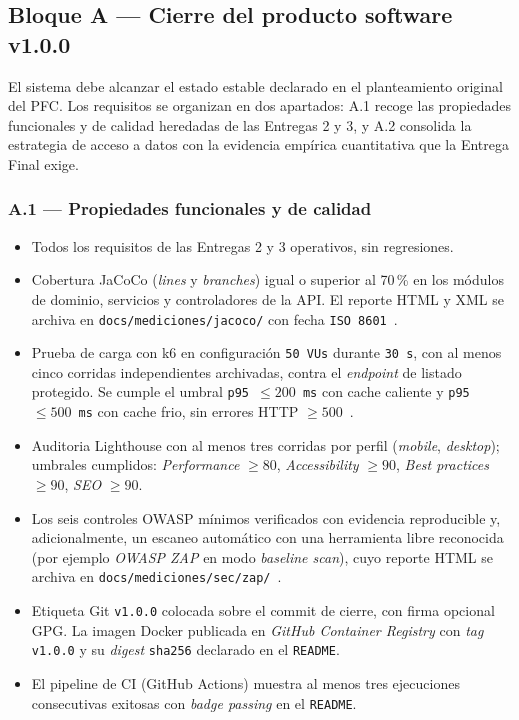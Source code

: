 \documentclass[11pt,a4paper]{article}
\begin{document}
\subsection{Bloque A --- Cierre del producto software v1.0.0}

El sistema debe alcanzar el estado estable declarado en el planteamiento original del PFC. Los requisitos se organizan en dos apartados: A.1 recoge las propiedades funcionales y de calidad heredadas de las Entregas 2 y 3, y A.2 consolida la estrategia de acceso a datos con la evidencia emp\'{i}rica cuantitativa que la Entrega Final exige.

\subsubsection*{A.1 --- Propiedades funcionales y de calidad}

\begin{itemize}
    \item Todos los requisitos de las Entregas 2 y 3 operativos, sin regresiones.
    \item Cobertura JaCoCo (\emph{lines} y \emph{branches}) igual o superior al 70\,\% en los m\'{o}dulos de dominio, servicios y controladores de la API. El reporte HTML y XML se archiva en \texttt{docs/mediciones/jacoco/} con fecha \texttt{ISO 8601}~\cite{washizaki2024swebok}.
    \item Prueba de carga con k6 en configuraci\'{o}n \texttt{50 VUs} durante \texttt{30 s}, con al menos cinco corridas independientes archivadas, contra el \emph{endpoint} de listado protegido. Se cumple el umbral \texttt{p95 $\leq 200$\,ms} con cache caliente y \texttt{p95 $\leq 500$\,ms} con cache frio, sin errores HTTP $\geq 500$~\cite{iso25010,ortega2022securecoding}.
    \item Auditoria Lighthouse con al menos tres corridas por perfil (\emph{mobile}, \emph{desktop}); umbrales cumplidos: \emph{Performance} $\geq 80$, \emph{Accessibility} $\geq 90$, \emph{Best practices} $\geq 90$, \emph{SEO} $\geq 90$.
    \item Los seis controles OWASP m\'{i}nimos verificados con evidencia reproducible y, adicionalmente, un escaneo autom\'{a}tico con una herramienta libre reconocida (por ejemplo \emph{OWASP ZAP} en modo \emph{baseline scan}), cuyo reporte HTML se archiva en \texttt{docs/mediciones/sec/zap/}~\cite{owasp2021top10}.
    \item Etiqueta Git \texttt{v1.0.0} colocada sobre el commit de cierre, con firma opcional GPG. La imagen Docker publicada en \emph{GitHub Container Registry} con \emph{tag} \texttt{v1.0.0} y su \emph{digest} \texttt{sha256} declarado en el \texttt{README}.
    \item El pipeline de CI (GitHub Actions) muestra al menos tres ejecuciones consecutivas exitosas con \emph{badge passing} en el \texttt{README}.
\end{itemize}
\end{document}
